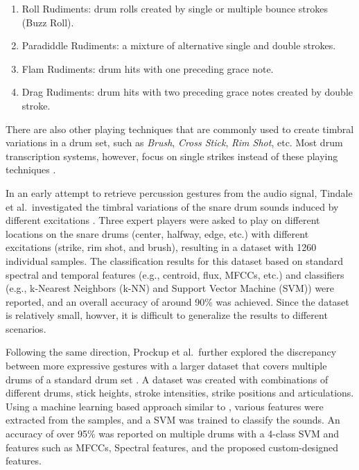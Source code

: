 \documentclass{article}
\begin{document}
\begin{enumerate}
	\item Roll Rudiments: drum rolls created by single or multiple bounce strokes (Buzz Roll).
	\item Paradiddle Rudiments: a mixture of alternative single and double strokes. 
	\item Flam Rudiments: drum hits with one preceding grace note.
	\item Drag Rudiments: drum hits with two preceding grace notes created by double stroke.
\end{enumerate}

There are also other playing techniques that are commonly used to create timbral variations in a drum set, such as \textit{Brush}, \textit{Cross Stick}, \textit{Rim Shot}, etc. Most drum transcription systems, however, focus on single strikes instead of these playing techniques \cite{Benetos2014, Dittmar2014, Thompson2014, Roebel2015, Wu2015a}. 

In an early attempt to retrieve percussion gestures from the audio signal, Tindale et al.~investigated the timbral variations of the snare drum sounds induced by different excitations \cite{Tindale2004}. Three expert players were asked to play on different locations on the snare drums (center, halfway, edge, etc.) with different excitations (strike, rim shot, and brush), resulting in a dataset with 1260 individual samples. The classification results for this dataset based on standard spectral and temporal features (e.g., centroid, flux, MFCCs, etc.) and classifiers (e.g., k-Nearest Neighbors (k-NN) and Support Vector Machine (SVM)) were reported, and an overall accuracy of around 90\% was achieved. Since the dataset is relatively small, howver, it is difficult to generalize the results to different scenarios.  

Following the same direction, Prockup et al.~further explored the discrepancy between more expressive gestures with a larger dataset that covers multiple drums of a standard drum set \cite{Prockup2013}. A dataset was created with combinations of different drums, stick heights, stroke intensities, strike positions and articulations. Using a machine learning based approach similar to \cite{Tindale2004}, various features were extracted from the samples, and a SVM was trained to classify the sounds. An accuracy of over 95\% was reported on multiple drums with a 4-class SVM and features such as MFCCs, Spectral features, and the proposed custom-designed features. 
\end{document}
